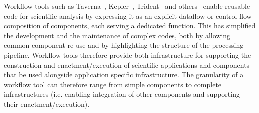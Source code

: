 Workflow tools such as Taverna~\cite{Taverna}, Kepler~\cite{Kepler},
Trident~\cite{Trident} and others~\cite{iantaylorsbook}  enable reusable code for scientific analysis by
expressing it as an explicit dataflow or control flow composition of
components, each serving a dedicated function. This has simplified the
development and the maintenance of complex codes, both by allowing
common component re-use and by highlighting the structure of the
processing pipeline. Workflow tools therefore provide both
infrastructure for supporting the construction and enactment/execution
of scientific applications and components that be used alongside
application specific infrastructure. The granularity of a workflow
tool can therefore range from simple components to complete
infrastructures (i.e. enabling integration of other components and
supporting their enactment/execution).

